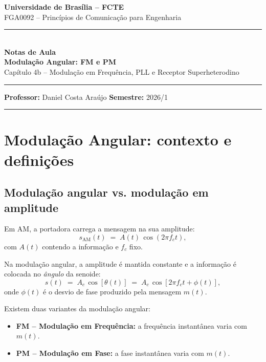 \documentclass[11pt,a4paper]{article}
\newcommand{\AM}{\text{AM}}
\begin{document}
\begin{center}
  {\large\textbf{Universidade de Brasília -- FCTE}}\\[0.2cm]
  {\normalsize FGA0092 -- Princípios de Comunicação para Engenharia}\\[0.4cm]
  \rule{14cm}{0.8pt}\\[0.3cm]
  {\LARGE\textbf{Notas de Aula}}\\[0.15cm]
  {\Large\textbf{Modulação Angular: FM e PM}}\\[0.2cm]
  {\normalsize Capítulo 4b -- Modulação em Frequência, PLL e Receptor Superheterodino}\\[0.3cm]
  \rule{14cm}{0.8pt}
\end{center}

\vspace{0.3cm}
\textbf{Professor:} Daniel Costa Araújo \hfill \textbf{Semestre:} 2026/1

\tableofcontents
\bigskip\hrule\bigskip

\section{Modulação Angular: contexto e definições}

\subsection{Modulação angular vs. modulação em amplitude}

Em AM, a portadora carrega a mensagem na sua amplitude:
\[
  s_{\AM}(t) \;=\; A(t)\,\cos(2\pi f_c t),
\]
com $A(t)$ contendo a informação e $f_c$ fixo.

Na modulação angular, a amplitude é mantida constante e a informação é colocada no \emph{ângulo} da senoide:
\[
  s(t) \;=\; A_c\,\cos[\theta(t)] \;=\; A_c\,\cos[2\pi f_c t + \phi(t)],
\]
onde $\phi(t)$ é o desvio de fase produzido pela mensagem $m(t)$.

Existem duas variantes da modulação angular:
\begin{itemize}
  \item \textbf{FM -- Modulação em Frequência:} a frequência instantânea varia com $m(t)$.
  \item \textbf{PM -- Modulação em Fase:} a fase instantânea varia com $m(t)$.
\end{itemize}
\end{document}
